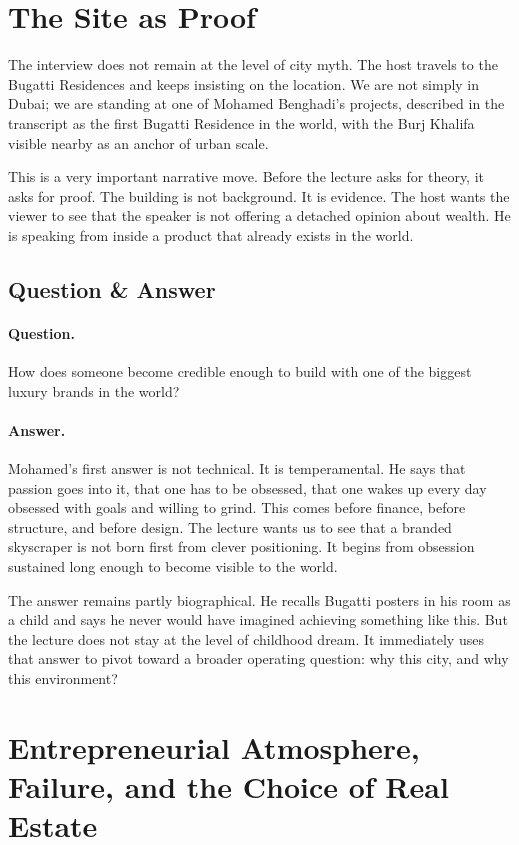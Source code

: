 \section{The Site as Proof}

The interview does not remain at the level of city myth. The host travels to the Bugatti Residences and keeps insisting on the location. We are not simply in Dubai; we are standing at one of Mohamed Benghadi's projects, described in the transcript as the first Bugatti Residence in the world, with the Burj Khalifa visible nearby as an anchor of urban scale.

This is a very important narrative move. Before the lecture asks for theory, it asks for proof. The building is not background. It is evidence. The host wants the viewer to see that the speaker is not offering a detached opinion about wealth. He is speaking from inside a product that already exists in the world.

\subsection{Question \& Answer}

\paragraph{Question.} How does someone become credible enough to build with one of the biggest luxury brands in the world?

\paragraph{Answer.} Mohamed's first answer is not technical. It is temperamental. He says that passion goes into it, that one has to be obsessed, that one wakes up every day obsessed with goals and willing to grind. This comes before finance, before structure, and before design. The lecture wants us to see that a branded skyscraper is not born first from clever positioning. It begins from obsession sustained long enough to become visible to the world.

The answer remains partly biographical. He recalls Bugatti posters in his room as a child and says he never would have imagined achieving something like this. But the lecture does not stay at the level of childhood dream. It immediately uses that answer to pivot toward a broader operating question: why this city, and why this environment?

\section{Entrepreneurial Atmosphere, Failure, and the Choice of Real Estate}

